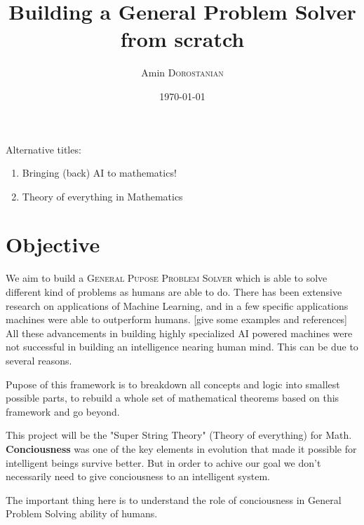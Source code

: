 \documentclass{article}
\title{Building a General Problem Solver from scratch} %
\author{Amin \textsc{Dorostanian}} %
\date{\today} %
\begin{document}
\maketitle %

Alternative titles:
\begin{enumerate}
\item Bringing (back) AI to mathematics!
\item Theory of everything in Mathematics
\end{enumerate}




\section{Objective}

We aim to build a \textsc{General Pupose Problem Solver} which is able to solve different kind of problems as humans
are able to do. There has been extensive research on applications of Machine Learning, and in a few specific applications machines were able to outperform humans. [give some examples and references]\\

All these advancements in building highly specialized AI powered machines were not successful in building an intelligence nearing human mind. This can be due to several reasons.


Pupose of this framework is to breakdown all concepts and logic into smallest possible parts, to rebuild a whole set of mathematical theorems based on this framework and go beyond.


This project will be the "Super String Theory" (Theory of everything) for Math.
\\

\textbf{Conciousness} was one of the key elements in evolution that made it possible for intelligent beings survive better. But in order to achive our goal we don't necessarily need to give conciousness to an intelligent system. 

The important thing here is to understand the role of conciousness in General Problem Solving ability of humans.
\\
\end{document}
